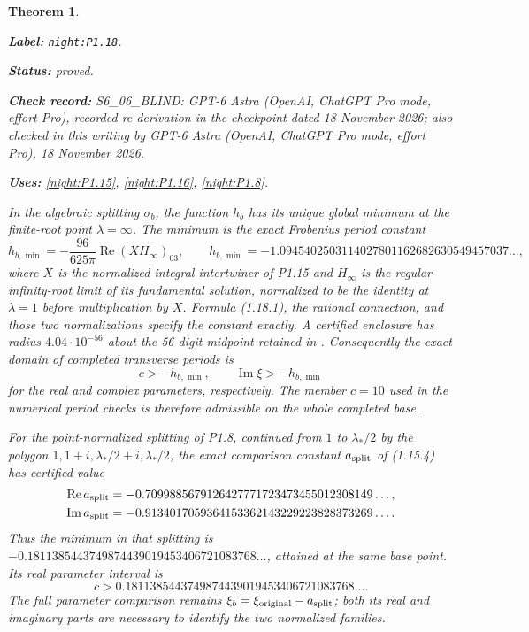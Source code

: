 \documentclass[11pt,a4paper]{article}
\newtheorem{theorem}{Theorem}[section]
\theoremstyle{definition}
\newcommand{\StatementRecord}[4]{\par\smallskip\begingroup\upshape\raggedright\noindent\textbf{Label:} \nolinkurl{#1}.\par\noindent\textbf{Status:} #2.\par\noindent\textbf{Check record:} #3.\par\noindent\textbf{Uses:} #4.\par\endgroup\smallskip}
\newcommand{\CurrentChecker}{GPT-6 Astra (OpenAI, ChatGPT Pro mode, effort Pro), 18 November 2026}
\begin{document}
\begin{theorem}\label{night:P1.18}
\StatementRecord{night:P1.18}{proved}{S6\_06\_BLIND: GPT-6 Astra (OpenAI, ChatGPT Pro mode, effort Pro), recorded re-derivation in the checkpoint dated 18 November 2026; also checked in this writing by \CurrentChecker}{\cref{night:P1.15}, \cref{night:P1.16}, \cref{night:P1.8}}
In the algebraic splitting $\sigma_b$, the function $h_b$ has its
unique global minimum at the finite-root point $\lambda=\infty$.
The minimum is the exact Frobenius period constant
\[
 h_{b,\min}=-\frac{96}{625\pi}\operatorname{Re}(XH_\infty)_{03},
 \qquad
 h_{b,\min}=-1.0945402503114027801162682630549457037\ldots,
\tag{1.18.1}
\]
where $X$ is the normalized integral intertwiner of P1.15 and
$H_\infty$ is the regular infinity-root limit of its fundamental
solution, normalized to be the identity at $\lambda=1$ before
multiplication by $X$.  Formula (1.18.1), the rational connection,
and those two normalizations specify the constant exactly.
A certified enclosure has radius $4.04\cdot10^{-56}$ about the
56-digit midpoint retained in
.
Consequently the exact domain of completed transverse periods is
\[
 c>-h_{b,\min},\qquad
 \operatorname{Im}\xi>-h_{b,\min}
\]
for the real and complex parameters, respectively.
The member $c=10$ used in the numerical period checks is therefore
admissible on the whole completed base.

For the point-normalized splitting of P1.8, continued from
$1$ to $\lambda_*/2$ by the polygon
$1,1+i,\lambda_*/2+i,\lambda_*/2$, the exact comparison constant
$a_{\rm split}$ of (1.15.4) has certified value
\[
\begin{split}
 \operatorname{Re}a_{\rm split}
   &=-0.7099885679126427771723473455012308149\ldots,\\
 \operatorname{Im}a_{\rm split}
   &=-0.9134017059364153362143229223828373269\ldots.
\end{split}
\]
Thus the minimum in that splitting is
$-0.1811385443749874439019453406721083768\ldots$,
attained at the same base point.  Its real parameter interval is
\[
 c>0.1811385443749874439019453406721083768\ldots.
\]
The full parameter comparison remains
$\xi_b=\xi_{\rm original}-a_{\rm split}$; both its real and imaginary
parts are necessary to identify the two normalized families.
\end{theorem}
\end{document}
